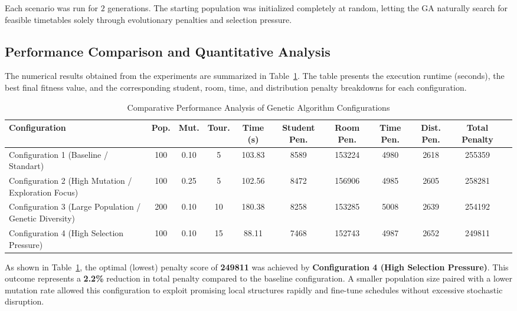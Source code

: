 Each scenario was run for $2$ generations. The starting population was initialized completely at random, letting the GA naturally search for feasible timetables solely through evolutionary penalties and selection pressure.

\subsection{Performance Comparison and Quantitative Analysis}
\label{subsec:performance_comparisons}

The numerical results obtained from the experiments are summarized in Table~\ref{tab:ga_experiments}. The table presents the execution runtime (seconds), the best final fitness value, and the corresponding student, room, time, and distribution penalty breakdowns for each configuration.

\begin{table}[htbp]
\centering
\caption{Comparative Performance Analysis of Genetic Algorithm Configurations}
\label{tab:ga_experiments}
\begin{tabular}{lcccccccccr}
\hline
\textbf{Configuration} & \textbf{Pop.} & \textbf{Mut.} & \textbf{Tour.} & \textbf{Time (s)} & \textbf{Student Pen.} & \textbf{Room Pen.} & \textbf{Time Pen.} & \textbf{Dist. Pen.} & \textbf{Total Penalty} \\ \hline
Configuration 1 (Baseline / Standart) & 100 & 0.10 & 5 & 103.83 & 8589 & 153224 & 4980 & 2618 & 255359 \\
Configuration 2 (High Mutation / Exploration Focus) & 100 & 0.25 & 5 & 102.56 & 8472 & 156906 & 4985 & 2605 & 258281 \\
Configuration 3 (Large Population / Genetic Diversity) & 200 & 0.10 & 10 & 180.38 & 8258 & 153285 & 5008 & 2639 & 254192 \\
Configuration 4 (High Selection Pressure) & 100 & 0.10 & 15 & 88.11 & 7468 & 152743 & 4987 & 2652 & 249811 \\ \hline
\end{tabular}
\end{table}

As shown in Table~\ref{tab:ga_experiments}, the optimal (lowest) penalty score of \textbf{249811} was achieved by \textbf{Configuration 4 (High Selection Pressure)}. This outcome represents a \textbf{2.2\%} reduction in total penalty compared to the baseline configuration. A smaller population size paired with a lower mutation rate allowed this configuration to exploit promising local structures rapidly and fine-tune schedules without excessive stochastic disruption.

